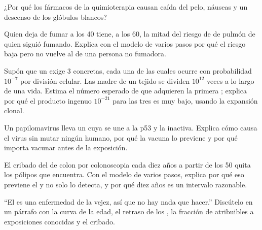 \begin{exercise}[$\star\star$]\label{exo:g11:cancer:10}
¿Por qué los fármacos de la quimioterapia causan caída del pelo,
náuseas y un descenso de los glóbulos blancos?
\end{exercise}

\begin{exercise}[$\star\star$]\label{exo:g11:cancer:11}
Quien deja de fumar a los 40 tiene, a los 60, la mitad del riesgo de
 de pulmón de quien siguió fumando. Explica con el modelo de
varios pasos por qué el riesgo baja pero no vuelve al de una persona no
fumadora.
\end{exercise}

\begin{exercise}[$\star\star\star$]\label{exo:g11:cancer:12}
Supón que un  exige 3  concretas, cada una de las
cuales ocurre con probabilidad $10^{-7}$ por división celular. Las
 madre de un tejido se dividen $10^{12}$ veces a lo largo de una
vida. Estima el número esperado de  que adquieren la primera
; explica por qué el producto ingenuo $10^{-21}$ para las tres
es muy bajo, usando la expansión clonal.
\end{exercise}

\begin{exercise}[$\star\star\star$]\label{exo:g11:cancer:13}
Un papilomavirus lleva un  cuya  se une a la p53 y la
inactiva. Explica cómo causa  el virus sin mutar ningún 
humano, por qué la vacuna lo previene y por qué importa vacunar antes
de la exposición.
\end{exercise}

\begin{exercise}[$\star\star\star$]\label{exo:g11:cancer:14}
El cribado del  de colon por colonoscopia cada diez años a partir
de los 50 quita los pólipos que encuentra. Con el modelo de varios
pasos, explica por qué eso previene el  y no solo lo detecta, y
por qué diez años es un intervalo razonable.
\end{exercise}

\begin{exercise}[$\star\star\star$]\label{exo:g11:cancer:15}
``El  es una enfermedad de la vejez, así que no hay nada que
hacer.'' Discútelo en un párrafo con la curva de la edad, el retraso de
los , la fracción de  atribuibles a exposiciones
conocidas y el cribado.
\end{exercise}


